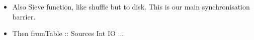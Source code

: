 


\begin{itemize}
\item Also Sieve function, like shuffle but to disk.
      This is our main synchronisation barrier.
\item Then fromTable :: Sources Int IO ...
\end{itemize}
